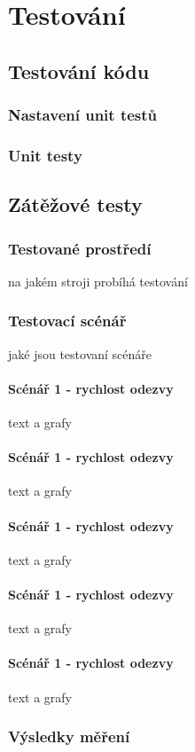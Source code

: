 \documentclass[thesis=M,czech]{FITthesis}[2012/06/26]
\begin{document}
\chapter{Testování}

\section{Testování kódu}
\subsection{Nastavení unit testů}
\subsection{Unit testy}

\section{Zátěžové testy}
\subsection{Testované prostředí}
na jakém stroji probíhá testování
\subsection{Testovací scénář}
jaké jsou testovaní scénáře
\subsubsection{Scénář 1 - rychlost odezvy}
text a grafy
\subsubsection{Scénář 1 - rychlost odezvy}
text a grafy
\subsubsection{Scénář 1 - rychlost odezvy}
text a grafy
\subsubsection{Scénář 1 - rychlost odezvy}
text a grafy
\subsubsection{Scénář 1 - rychlost odezvy}
text a grafy
\subsection{Výsledky měření}
\end{document}
